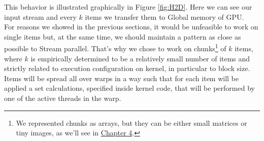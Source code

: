 	This behavior is illustrated graphically in Figure \ref{fig:H2D}. Here we can see our input stream and every \(k\) items we transfer them to Global memory of GPU.\\
	For reasons we showed in the previous sections, it would be unfeasible to work on single items but, at the same time, we should maintain a pattern as close as possible to Stream parallel. That's why we chose to work on chunks\footnote{We represented chunks as arrays, but they can be either small matrices or tiny images, as we'll see in \hyperref[chap:impl]{Chapter 4}.} of \(k\) items, where \(k\) is empirically determined to be a relatively small number of items and strictly related to execution configuration on kernel, in particular to block size.\\
	Items will be spread all over warps in a way such that for each item will be applied a set calculations, specified inside kernel code, that will be performed by one of the active threads in the warp.
	

